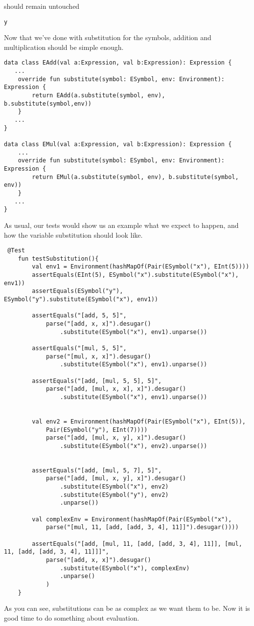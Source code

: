 \documentclass[11pt]{article}
\begin{document}
should remain untouched
\begin{verbatim}
y
\end{verbatim}


Now that we've done with substitution for the symbols, addition and multiplication should be simple enough.

\begin{verbatim}
data class EAdd(val a:Expression, val b:Expression): Expression {
   ...
    override fun substitute(symbol: ESymbol, env: Environment): Expression {
        return EAdd(a.substitute(symbol, env), b.substitute(symbol,env))
    }
   ...
}

data class EMul(val a:Expression, val b:Expression): Expression {
    ...
    override fun substitute(symbol: ESymbol, env: Environment): Expression {
        return EMul(a.substitute(symbol, env), b.substitute(symbol, env))
    }
   ...
}

\end{verbatim}

As usual, our tests would show us an example what we expect to happen, and how the variable substitution should look like.

\begin{verbatim}
 @Test
    fun testSubstitution(){
        val env1 = Environment(hashMapOf(Pair(ESymbol("x"), EInt(5))))
        assertEquals(EInt(5), ESymbol("x").substitute(ESymbol("x"), env1))
        assertEquals(ESymbol("y"), ESymbol("y").substitute(ESymbol("x"), env1))

        assertEquals("[add, 5, 5]",
            parse("[add, x, x]").desugar()
                .substitute(ESymbol("x"), env1).unparse())

        assertEquals("[mul, 5, 5]",
            parse("[mul, x, x]").desugar()
                .substitute(ESymbol("x"), env1).unparse())

        assertEquals("[add, [mul, 5, 5], 5]",
            parse("[add, [mul, x, x], x]").desugar()
                .substitute(ESymbol("x"), env1).unparse())


        val env2 = Environment(hashMapOf(Pair(ESymbol("x"), EInt(5)),
            Pair(ESymbol("y"), EInt(7))))
            parse("[add, [mul, x, y], x]").desugar()
                .substitute(ESymbol("x"), env2).unparse())


        assertEquals("[add, [mul, 5, 7], 5]",
            parse("[add, [mul, x, y], x]").desugar()
                .substitute(ESymbol("x"), env2)
                .substitute(ESymbol("y"), env2)
                .unparse())

        val complexEnv = Environment(hashMapOf(Pair(ESymbol("x"),
            parse("[mul, 11, [add, [add, 3, 4], 11]]").desugar())))

        assertEquals("[add, [mul, 11, [add, [add, 3, 4], 11]], [mul, 11, [add, [add, 3, 4], 11]]]",
            parse("[add, x, x]").desugar()
                .substitute(ESymbol("x"), complexEnv)
                .unparse()
            )
    }
\end{verbatim}
As you can see, substitutions can be as complex as we want them to be.
Now it is good time to do something about evaluation.
\end{document}
